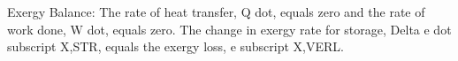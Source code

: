 Exergy Balance: The rate of heat transfer, Q dot, equals zero and the rate of work done, W dot, equals zero. The change in exergy rate for storage, Delta e dot subscript X,STR, equals the exergy loss, e subscript X,VERL.